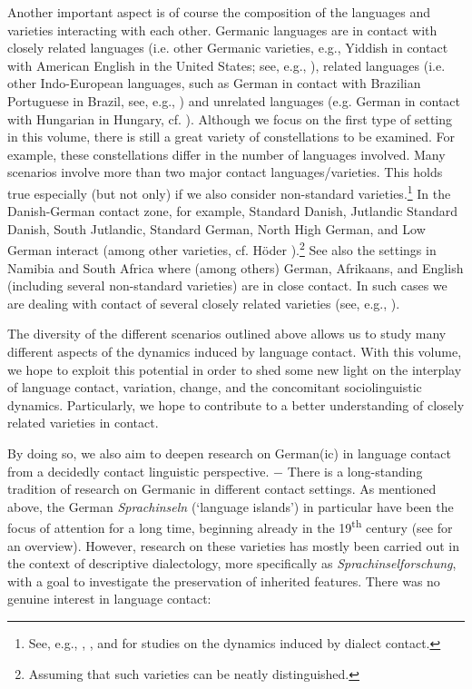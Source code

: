 \documentclass[output=paper]{langsci/langscibook}
\begin{document}
Another important aspect is of course the composition of the languages and varieties interacting with each other. Germanic languages are in contact with closely related languages (i.e. other Germanic varieties, e.g., Yiddish in contact with American English in the United States; see, e.g., ), related languages (i.e. other Indo-European languages, such as German in contact with Brazilian Portuguese in Brazil, see, e.g., \citealt{rosenberg_comparative_2003}) and unrelated languages (e.g. German in contact with Hungarian in Hungary, cf. \citealt{knipf-komlosi_ungarn_2008}). Although we focus on the first type of setting in this volume, there is still a great variety of constellations to be examined. For example, these constellations differ in the number of languages involved. Many scenarios involve more than two major contact languages/varieties. This holds true especially (but not only) if we also consider non-standard varieties.\footnote{See, e.g., \citet{schirmunski_sprachgeschichte_1930}, \citet{trudgill_dialects_1986}, and \citet{rosenberg_dialect_2005} for studies on the dynamics induced by dialect contact.} In the Danish-German contact zone, for example, Standard Danish, Jutlandic Standard Danish, South Jutlandic, Standard German, North High German, and Low German interact (among other varieties, cf. Höder ).\footnote{Assuming that such varieties can be neatly distinguished.} See also the settings in Namibia and South Africa where (among others) German, Afrikaans, and English (including several non-standard varieties) are in close contact. In such cases we are dealing with contact of several closely related varieties (see, e.g., \citealt{zimmer_deutsch_2019}).

The diversity of the different scenarios outlined above allows us to study many different aspects of the dynamics induced by language contact. With this volume, we hope to exploit this potential in order to shed some new light on the interplay of language contact, variation, change, and the concomitant sociolinguistic dynamics. Particularly, we hope to contribute to a better understanding of closely related varieties in contact. 

By doing so, we also aim to deepen research on German(ic) in language contact from a decidedly contact linguistic perspective. $-$ There is a long-standing tradition of research on Germanic in different contact settings. As mentioned above, the German \textit{Sprachinseln} (‘language islands’) in particular have been the focus of attention for a long time, beginning already in the 19\textsuperscript{th} century (see \citealt{Rosenberg2005} for an overview). However, research on these varieties has mostly been carried out in the context of descriptive dialectology, more specifically as \textit{Sprachinselforschung}, with a goal to investigate the preservation of inherited features. There was no genuine interest in language contact:
\end{document}
